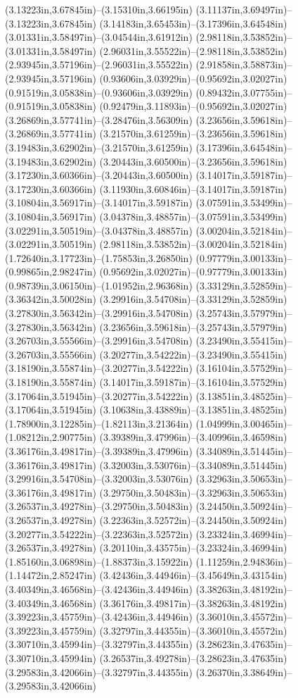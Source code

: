 (3.13223in,3.67845in)--(3.15310in,3.66195in) (3.11137in,3.69497in)--(3.13223in,3.67845in) (3.14183in,3.65453in)--(3.17396in,3.64548in) (3.01331in,3.58497in)--(3.04544in,3.61912in) (2.98118in,3.53852in)--(3.01331in,3.58497in) (2.96031in,3.55522in)--(2.98118in,3.53852in) (2.93945in,3.57196in)--(2.96031in,3.55522in) (2.91858in,3.58873in)--(2.93945in,3.57196in) (0.93606in,3.03929in)--(0.95692in,3.02027in) (0.91519in,3.05838in)--(0.93606in,3.03929in) (0.89432in,3.07755in)--(0.91519in,3.05838in) (0.92479in,3.11893in)--(0.95692in,3.02027in) (3.26869in,3.57741in)--(3.28476in,3.56309in) (3.23656in,3.59618in)--(3.26869in,3.57741in) (3.21570in,3.61259in)--(3.23656in,3.59618in) (3.19483in,3.62902in)--(3.21570in,3.61259in) (3.17396in,3.64548in)--(3.19483in,3.62902in) (3.20443in,3.60500in)--(3.23656in,3.59618in) (3.17230in,3.60366in)--(3.20443in,3.60500in) (3.14017in,3.59187in)--(3.17230in,3.60366in) (3.11930in,3.60846in)--(3.14017in,3.59187in) (3.10804in,3.56917in)--(3.14017in,3.59187in) (3.07591in,3.53499in)--(3.10804in,3.56917in) (3.04378in,3.48857in)--(3.07591in,3.53499in) (3.02291in,3.50519in)--(3.04378in,3.48857in) (3.00204in,3.52184in)--(3.02291in,3.50519in) (2.98118in,3.53852in)--(3.00204in,3.52184in) (1.72640in,3.17723in)--(1.75853in,3.26850in) (0.97779in,3.00133in)--(0.99865in,2.98247in) (0.95692in,3.02027in)--(0.97779in,3.00133in) (0.98739in,3.06150in)--(1.01952in,2.96368in) (3.33129in,3.52859in)--(3.36342in,3.50028in) (3.29916in,3.54708in)--(3.33129in,3.52859in) (3.27830in,3.56342in)--(3.29916in,3.54708in) (3.25743in,3.57979in)--(3.27830in,3.56342in) (3.23656in,3.59618in)--(3.25743in,3.57979in) (3.26703in,3.55566in)--(3.29916in,3.54708in) (3.23490in,3.55415in)--(3.26703in,3.55566in) (3.20277in,3.54222in)--(3.23490in,3.55415in) (3.18190in,3.55874in)--(3.20277in,3.54222in) (3.16104in,3.57529in)--(3.18190in,3.55874in) (3.14017in,3.59187in)--(3.16104in,3.57529in) (3.17064in,3.51945in)--(3.20277in,3.54222in) (3.13851in,3.48525in)--(3.17064in,3.51945in) (3.10638in,3.43889in)--(3.13851in,3.48525in) (1.78900in,3.12285in)--(1.82113in,3.21364in) (1.04999in,3.00465in)--(1.08212in,2.90775in) (3.39389in,3.47996in)--(3.40996in,3.46598in) (3.36176in,3.49817in)--(3.39389in,3.47996in) (3.34089in,3.51445in)--(3.36176in,3.49817in) (3.32003in,3.53076in)--(3.34089in,3.51445in) (3.29916in,3.54708in)--(3.32003in,3.53076in) (3.32963in,3.50653in)--(3.36176in,3.49817in) (3.29750in,3.50483in)--(3.32963in,3.50653in) (3.26537in,3.49278in)--(3.29750in,3.50483in) (3.24450in,3.50924in)--(3.26537in,3.49278in) (3.22363in,3.52572in)--(3.24450in,3.50924in) (3.20277in,3.54222in)--(3.22363in,3.52572in) (3.23324in,3.46994in)--(3.26537in,3.49278in) (3.20110in,3.43575in)--(3.23324in,3.46994in) (1.85160in,3.06898in)--(1.88373in,3.15922in) (1.11259in,2.94836in)--(1.14472in,2.85247in) (3.42436in,3.44946in)--(3.45649in,3.43154in) (3.40349in,3.46568in)--(3.42436in,3.44946in) (3.38263in,3.48192in)--(3.40349in,3.46568in) (3.36176in,3.49817in)--(3.38263in,3.48192in) (3.39223in,3.45759in)--(3.42436in,3.44946in) (3.36010in,3.45572in)--(3.39223in,3.45759in) (3.32797in,3.44355in)--(3.36010in,3.45572in) (3.30710in,3.45994in)--(3.32797in,3.44355in) (3.28623in,3.47635in)--(3.30710in,3.45994in) (3.26537in,3.49278in)--(3.28623in,3.47635in) (3.29583in,3.42066in)--(3.32797in,3.44355in) (3.26370in,3.38649in)--(3.29583in,3.42066in) 
